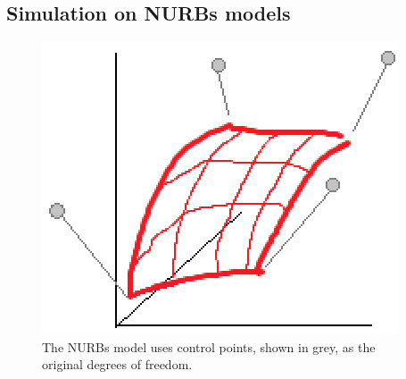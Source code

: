 \documentclass[sigconf]{acmart}
\begin{document}
\subsection{Simulation on NURBs models}

\begin{figure}[h]
  \centering
  \includegraphics[width=\linewidth]{figures/nurbs_surface}
  \caption{The NURBs model uses control points, shown in grey, as the original degrees of freedom.}
\end{figure}
\end{document}
